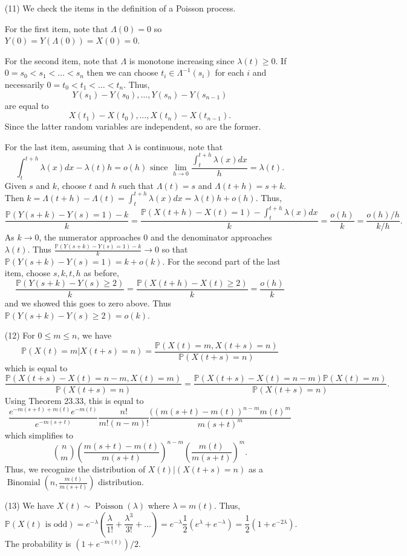 \documentclass[10pt]{article}
\renewcommand{\P}{\mathbb{P}}
\newcommand{\Binom}{\operatorname{Binomial}}
\newcommand{\Poiss}{\operatorname{Poisson}}
\begin{document}
\begin{enumerate}[(1)]
\item[(11)]
We check the items in the definition of a Poisson process.

For the first item, note that $\Lambda(0)=0$ so $Y(0)=Y(\Lambda(0))=X(0)=0$.

For the second item, note that $\Lambda$ is monotone increasing since
$\lambda(t)\geq 0$. If $0 = s_0 < s_1 < \ldots < s_n$ then we can choose
$t_i\in \Lambda^{-1}(s_i)$ for each $i$ and necessarily
$0 = t_0 < t_1 < \ldots < t_n$. Thus,
\[
    Y(s_1)-Y(s_0), \ldots, Y(s_n)-Y(s_{n-1})
\]
are equal to
\[
    X(t_1) - X(t_0), \ldots, X(t_n) - X(t_{n-1}).
\]
Since the latter random variables are independent, so are the former.

For the last item, assuming that $\lambda$ is continuous, note that
\[
    \int_t^{t+h} \lambda(x)dx - \lambda(t)h = o(h) \text{ since }
    \lim_{h\to 0} \frac{\int_t^{t+h}\lambda(x)dx}{h} = \lambda(t).
\]
Given $s$ and $k$, choose $t$ and $h$ such that $\Lambda(t)=s$ and
$\Lambda(t+h)=s+k$.
Then $k=\Lambda(t+h)-\Lambda(t)=\int_t^{t+h}\lambda(x)dx=\lambda(t)h+o(h)$.
Thus,
\[
    \frac{\P(Y(s+k) - Y(s)=1) - k}{k}=
    \frac{\P(X(t+h)-X(t) = 1) - \int_t^{t+h}\lambda(x)dx}{k}
    = \frac{o(h)}{k} = \frac{o(h) / h}{k / h}.
\]
As $k\to 0$, the numerator approaches 0 and the denominator approaches
$\lambda(t)$. Thus $\frac{\P(Y(s+k) - Y(s)=1) - k}{k}\to 0$ so that
$\P(Y(s+k) - Y(s) = 1)=k+o(k)$.
For the second part of the last item, choose $s,k,t,h$ as before,
\[
    \frac{\P(Y(s+k) - Y(s)\geq 2)}{k} = \frac{\P(X(t+h)-X(t) \geq 2)}{k}
    = \frac{o(h)}{k}
\]
and we showed this goes to zero above. Thus $\P(Y(s+k)-Y(s)\geq 2)=o(k)$.

\item[(12)] For $0\leq m\leq n$, we have
\[
    \P(X(t)=m | X(t+s)=n) = \frac{\P(X(t)=m, X(t+s)=n)}{\P(X(t+s)=n)}
\]
which is equal to
\[
    \frac{\P(X(t+s)-X(t)=n-m, X(t)=m)}{\P(X(t+s)=n)} =
    \frac{\P(X(t+s)-X(t)=n-m)\P(X(t)=m)}{\P(X(t+s)=n)}.
\]
Using Theorem 23.33, this is equal to
\[
    \frac{e^{-m(s+t)+m(t)}e^{-m(t)}}{e^{-m(s+t)}}
    \frac{n!}{m!(n-m)!}
    \frac{((m(s+t)-m(t))^{n-m}m(t)^m}{m(s+t)^m}
\]
which simplifies to
\[
    \binom{n}{m}\left(\frac{m(s+t)-m(t)}{m(s+t)}\right)^{n-m}
    \left(\frac{m(t)}{m(s+t)}\right)^m.
\]
Thus, we recognize the distribution of $X(t)|(X(t+s)=n)$ as a
$\Binom\left(n,\frac{m(t)}{m(s+t)}\right)$ distribution.

\item[(13)] We have $X(t)\sim \Poiss(\lambda)$ where $\lambda=m(t)$.
Thus,
\[
  \P(X(t) \text{ is odd}) = e^{-\lambda}\left(
      \frac{\lambda}{1!} + \frac{\lambda^3}{3!} + \ldots
  \right) =
  e^{-\lambda}\frac{1}{2}(e^{\lambda} + e^{-\lambda})
  =\frac{1}{2}(1+e^{-2\lambda}).
\]
The probability is $(1+e^{-m(t)})/2$.

\end{enumerate}
\end{document}
